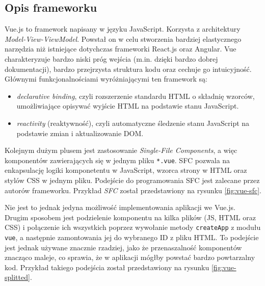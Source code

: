 \documentclass[shortabstract]{iithesis}
\theoremstyle{definition} \newtheorem{definition}{Definicja}[]
\theoremstyle{remark} \newtheorem{remark}[definition]{Observation}
\theoremstyle{plain} \newtheorem{theorem}[definition]{Theorem}
\theoremstyle{plain} \newtheorem{lemma}[definition]{Lemma}
\begin{document}
\subsection{Opis frameworku}
Vue.js to framework napisany w języku JavaScript. Korzysta z architektury \textit{Model-View-ViewModel}. Powstał on w celu stworzenia bardziej elastycznego narzędzia niż istniejące dotychczas frameworki React.js oraz Angular. Vue charakteryzuje bardzo niski próg wejścia (m.in. dzięki bardzo dobrej dokumentacji), bardzo przejrzysta struktura kodu oraz cechuje go intuicyjność. Głównymi funkcjonalnościami wyróżniającymi ten framework są:
\begin{itemize}
    \item \textit{declarative binding}, czyli rozszerzenie standardu HTML o składnię wzorców, umożliwiające opisywać wyjście HTML na podstawie stanu JavaScript.
    \item \textit{reactivity} (reaktywność), czyli automatyczne śledzenie stanu JavaScript na podstawie zmian i aktualizowanie DOM.
\end{itemize}

Kolejnym dużym plusem jest zastosowanie \textit{Single-File Components}, a więc komponentów zawierających się w jednym pliku \texttt{*.vue}. SFC pozwala na enkapsulację logiki komponetentu w JavaScript, wzorca strony w HTML oraz stylów CSS w jednym pliku. Podejście do programowania SFC jest zalecane przez autorów frameworku. Przykład \textit{SFC} został przedstawiony na rysunku \ref{fig:vue-sfc}.

Nie jest to jednak jedyna możliwość implementowania aplikacji we Vue.js. Drugim sposobem jest podzielenie komponentu na kilka plików (JS, HTML oraz CSS) i połączenie ich wszystkich poprzez wywołanie metody \texttt{createApp} z modułu \texttt{vue}, a następnie zamontowania jej do wybranego ID z pliku HTML. To podejście jest jednak używane znacznie rzadziej, jako że przenaszalność komponentów znacząco maleje, co sprawia, że w aplikacji mógłby powstać bardzo powtarzalny kod. Przykład takiego podejścia został przedstawiony na rysunku \ref{fig:vue-splitted}.
\end{document}
